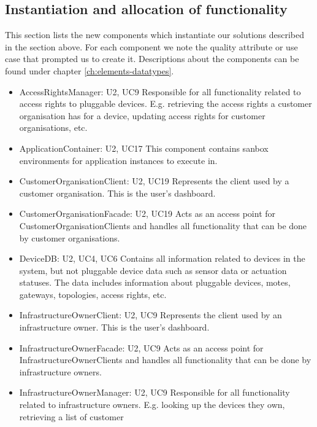 {{{\subsection{Instantiation and allocation of functionality}
    This section lists the new components which instantiate our solutions
    described in the section above. For each component we note the quality
    attribute or use case that prompted us to create it. Descriptions about
    the components can be found under chapter \ref{ch:elements-datatypes}. \\

    \begin{itemize}
        \item AccessRightsManager: U2, UC9
            Responsible for all functionality related to access rights to pluggable devices.
            E.g. retrieving the access rights a customer organisation has for a device,
            updating access rights for customer organisations, etc.
        \item ApplicationContainer: U2, UC17
            This component contains sanbox environments for application instances to execute in.
        \item CustomerOrganisationClient: U2, UC19
            Represents the client used by a customer organisation. This is the user's dashboard.
        \item CustomerOrganisationFacade: U2, UC19
            Acts as an access point for CustomerOrganisationClients and handles all functionality that can be done by customer organisations.
        \item DeviceDB: U2, UC4, UC6
            Contains all information related to devices in the system, but not pluggable device
            data such as sensor data or actuation statuses. The data includes
            information about pluggable devices, motes, gateways, topologies,
            access rights, etc.
        \item InfrastructureOwnerClient: U2, UC9
            Represents the client used by an infrastructure owner. This is the user's dashboard.
        \item InfrastructureOwnerFacade: U2, UC9
            Acts as an access point for InfrastructureOwnerClients and handles all functionality that can be done by infrastructure owners.
        \item InfrastructureOwnerManager: U2, UC9
            Responsible for all functionality related to infrastructure owners. E.g.
            looking up the devices they own, retrieving a list of customer

\end{itemize}}}}
